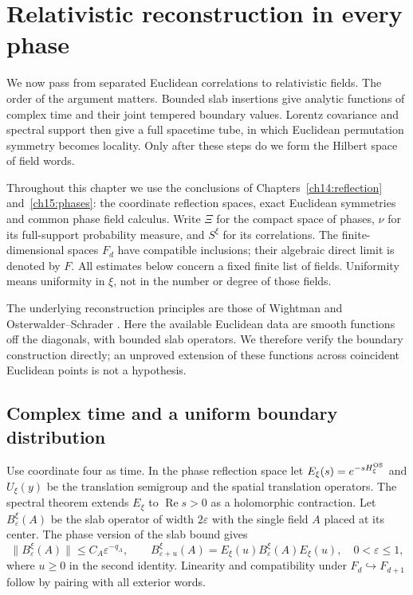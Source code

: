 \chapter{Relativistic reconstruction in every phase}
\label{ch16:reconstruction}

We now pass from separated Euclidean correlations to relativistic fields.
The order of the argument matters. Bounded slab insertions give analytic
functions of complex time and their joint tempered boundary values.
Lorentz covariance and spectral support then give a full spacetime
tube, in which Euclidean permutation symmetry becomes locality. Only
after these steps do we form the Hilbert space of field words.

Throughout this chapter we use the conclusions of
Chapters~\ref{ch14:reflection} and~\ref{ch15:phases}: the coordinate
reflection spaces, exact Euclidean symmetries and common phase field
calculus. Write $\Xi$ for the compact space of phases, $\nu$ for its
full-support probability measure, and $S^\xi$ for its correlations.
The finite-dimensional spaces $F_d$ have compatible inclusions; their
algebraic direct limit is denoted by $F$. All estimates below concern a
fixed finite list of fields. Uniformity means uniformity in $\xi$, not in
the number or degree of those fields.

The underlying reconstruction principles are those of Wightman and
Osterwalder--Schrader \cite{Wightman1956,OsterwalderSchrader1973,OsterwalderSchrader1975}.
Here the available Euclidean data are smooth functions off the diagonals,
with bounded slab operators. We therefore verify the boundary construction
directly; an unproved extension of these functions across coincident Euclidean
points is not a hypothesis.

\section{Complex time and a uniform boundary distribution}
\label{ch16:boundary-section}

Use coordinate four as time. In the phase reflection space let
$E_\xi(s)=e^{-sH_\xi^{\rm OS}}$ and $U_\xi(y)$ be the translation semigroup and the spatial
translation operators. The spectral theorem extends $E_\xi$ to
$\operatorname{Re}s>0$ as a holomorphic contraction. Let $B_\varepsilon^\xi(A)$
be the slab operator of width $2\varepsilon$ with the single field $A$
placed at its center. The phase version of the slab bound gives
\begin{equation}
 \|B_\varepsilon^\xi(A)\|\le C_A\varepsilon^{-q_A},\qquad
 B_{\varepsilon+u}^\xi(A)
       =E_\xi(u)B_\varepsilon^\xi(A)E_\xi(u),
 \quad 0<\varepsilon\le1,
 \label{ch16:slabs}
\end{equation}
where $u\ge0$ in the second identity. Linearity and compatibility under
$F_d\hookrightarrow F_{d+1}$ follow by pairing with all exterior words.

